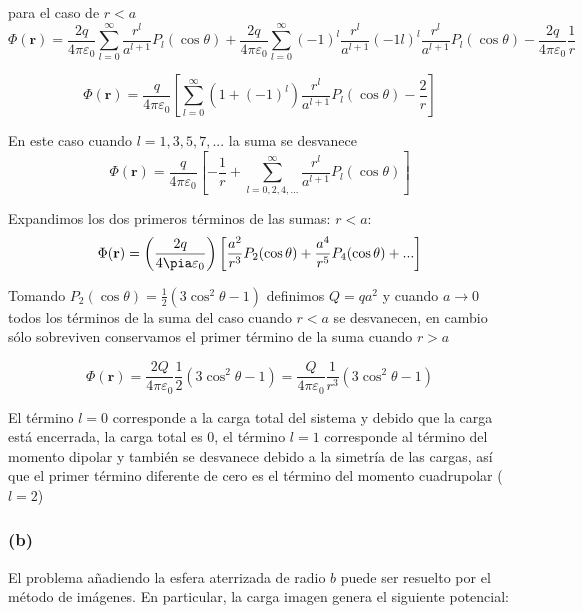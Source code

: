 \documentclass{article}
\begin{document}
para el caso de $r < a$
\begin{equation}
    \Phi(\mathbf{r}) = \frac{2q}{4\pi\varepsilon_0} \sum_{l = 0}^{\infty} \frac{r^l}{a^{l+1}}P_l(\cos \theta) + \frac{2q}{4\pi\varepsilon_0} \sum_{l=0}^{\infty} (-1)^l \frac{r^l}{a^{l+1}}(-1l)^l \frac{r^l}{a^{l+1}} P_l(\cos \theta) - \frac{2q}{4\pi\varepsilon_0}\frac{1}{r}
\end{equation}

\begin{equation}
    \Phi(\mathbf{r}) = \frac{q}{4\pi \varepsilon_0} \left [\sum_{l = 0}^{\infty} (1 + (-1)^l)\frac{r^l}{a^{l+1}}P_l (\cos\theta) - \frac{2}{r} \right]
\end{equation}

En este caso cuando $l = 1, 3, 5, 7, ...$ la suma se desvanece
\begin{equation}
        \Phi(\mathbf{r})   = \frac{q}{4\pi\varepsilon_0} \left[ -\frac{1}{r} + \sum_{l = 0, 2, 4, ...}^{\infty}\frac{r^l}{a^{l+1}}P_l(\cos \theta) \right]
\end{equation}

Expandimos los dos primeros términos de las sumas:
$r < a$:
\begin{equation}
    \Phi(\mathbf{r}) = \left(\frac{2q}{4\pia\varepsilon_0} \right) \left[ \frac{a^2}{r^{3}}P_2(\cos \theta) + \frac{a^4}{r^5} P_4(\cos \theta) + ... \right ]
\end{equation}

Tomando $P_2(\cos\theta) = \frac{1}{2} (3\cos^2\theta - 1) $ definimos $Q = qa^2$ y cuando $a \to 0$ todos los términos de la suma del caso cuando $r < a$ se desvanecen, en cambio sólo sobreviven conservamos el primer término de la suma cuando $r > a$

\begin{equation}
    \Phi(\mathbf{r}) = \frac{2 Q }{4\pi \varepsilon_0} \frac{1}{2}(3 \cos^2 \theta -1 ) = \frac{Q}{4\pi\varepsilon_0} \frac{1}{r^3}(3\cos^2 \theta - 1)
\end{equation}

El término $l = 0$ corresponde a la carga total del sistema y debido que la carga está encerrada, la carga total es 0, el término $l = 1$ corresponde al término del momento dipolar y también se desvanece debido a la simetría de las cargas, así que el primer término diferente de cero es el término del momento cuadrupolar ($l= 2$)

\subsubsection*{(b)}
El problema añadiendo la esfera aterrizada de radio $b$ puede ser resuelto por el método de imágenes. En particular, la carga imagen genera el siguiente potencial:
\end{document}
